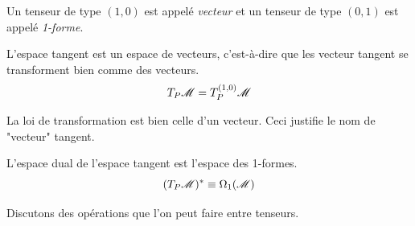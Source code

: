 \documentclass[a4paper,11pt]{report}
\begin{document}
                \begin{defn}
                    Un tenseur de type $(1,0)$ est appelé \textit{vecteur} et un tenseur de type $(0,1)$ est appelé \textit{1-forme}.
                \end{defn}
                
                \begin{prop}\begin{leftbar}
                    L'espace tangent est un espace de vecteurs, c'est-à-dire que les vecteur tangent se transforment bien comme des vecteurs.
                    \begin{equation}
                        T_P\mathscr{M} = T^{(1,0)}_P\mathscr{M}
                    \end{equation}
                \end{leftbar}\end{prop}
                
                La loi de transformation est bien celle d'un vecteur. Ceci justifie le nom de "vecteur" tangent.\\
                
                \begin{prop}\begin{leftbar}
                    L'espace dual de l'espace tangent est l'espace des 1-formes.
                    \begin{equation}
                        (T_P\mathscr{M})^* \equiv \Omega_1(\mathscr{M})
                    \end{equation}
                \end{leftbar}\end{prop}
                
                Discutons des opérations que l'on peut faire entre tenseurs.
                
\end{document}
